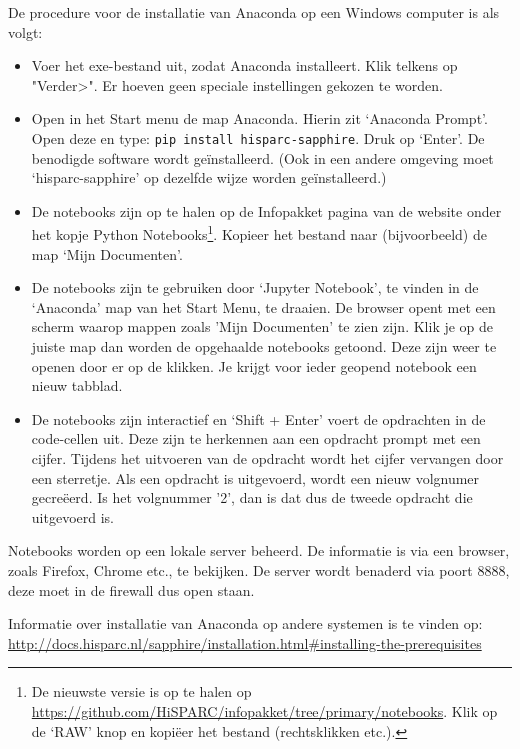 De procedure voor de installatie van Anaconda op een Windows computer is als volgt:

\begin{itemize}
\item Voer het exe-bestand uit, zodat Anaconda installeert. Klik telkens op "Verder>". Er hoeven geen speciale instellingen gekozen te worden.
\item Open in het Start menu de map Anaconda. Hierin zit `Anaconda Prompt'. Open deze en type: {\tt pip install hisparc-sapphire}. Druk op `Enter'. De benodigde \hisparc software wordt geïnstalleerd. (Ook in een andere \python omgeving moet `hisparc-sapphire' op dezelfde wijze worden geïnstalleerd.)
\item De notebooks zijn op te halen op de Infopakket pagina van de \hisparc website onder het kopje Python Notebooks\footnote{De nieuwste versie is op te halen op \url{https://github.com/HiSPARC/infopakket/tree/primary/notebooks}. Klik op de `RAW' knop en kopiëer het bestand (rechtsklikken etc.).}. Kopieer het bestand naar (bijvoorbeeld) de map `Mijn Documenten'. 
\item De notebooks zijn te gebruiken door `Jupyter Notebook', te vinden in de `Anaconda' map van het Start Menu, te draaien. De browser opent met een scherm waarop mappen zoals 'Mijn Documenten' te zien zijn. Klik je op de juiste map dan worden de opgehaalde notebooks getoond. Deze zijn weer te openen door er op de klikken. Je krijgt voor ieder geopend notebook een nieuw tabblad.
\item De notebooks zijn interactief en `Shift + Enter' voert de opdrachten in de code-cellen uit. Deze zijn te herkennen aan een opdracht prompt met een cijfer. Tijdens het uitvoeren van de opdracht wordt het cijfer vervangen door een sterretje. Als een opdracht is uitgevoerd, wordt een nieuw volgnumer gecreëerd. Is het volgnummer '2', dan is dat dus de tweede opdracht die uitgevoerd is.
\end{itemize}

Notebooks worden op een lokale server beheerd. De informatie is via een browser, zoals Firefox, Chrome etc., te bekijken. 
De server wordt benaderd via poort 8888, deze moet in de firewall dus open staan.

Informatie over installatie van Anaconda op andere systemen is te vinden op: \url{http://docs.hisparc.nl/sapphire/installation.html#installing-the-prerequisites} 


